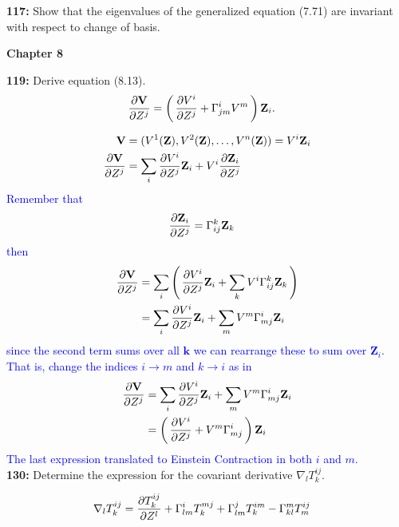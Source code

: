\documentclass[12pt,a4paper]{report}
\newcommand{\BLUE}[1]{\textcolor{blue}{#1}}
\newcommand{\COFF}[3]{\Gamma^{#1}_{{#2}{#3}}}
\newcommand{\VK}[1]{\textbf{#1}}
\begin{document}
\textbf{117: }Show that the eigenvalues of the generalized equation (7.71) are invariant with respect to change of basis.

\HLINE
\textbf{Chapter  8}

\textbf{119: }Derive equation (8.13).
\begin{align*}
	\PART{\VK{V}}{Z^j} &= \PAREN{\PART{V^i}{Z^j}+\COFF{i}{j}{m}V^m}\VK{Z}_i.
\end{align*}

\BLUE{\begin{align*}
	\VK{V} &= (V^1(\VK{Z}), V^2(\VK{Z}), \dots, V^n(\VK{Z})) = V^i\VK{Z}_i  \\
	\PART{\VK{V}}{Z^j} &= \sum_i \PART{V^i}{Z^j}\VK{Z}_i + V^i \PART{\VK{Z}_i}{Z^j} 
\end{align*}Remember that 
\begin{align*}
	\PART{\VK{Z}_i}{Z^j} &= \COFF{k}{i}{j}\VK{Z}_k
\end{align*}then
\begin{align*}
	\PART{\VK{V}}{Z^j} &= \sum_i \PAREN{ \PART{V^i}{Z^j}\VK{Z}_i + \sum_k V^i \COFF{k}{i}{j}\VK{Z}_k } \\
	&= \sum_i\PART{V^i}{Z^j}\VK{Z}_i + \sum_m V^m \COFF{i}{m}{j}\VK{Z}_i 
\end{align*}since the second term sums over all $\VK{k}$ we can rearrange these to sum over $\VK{Z}_i$.  That is, change the indices $i\to m$ and $k \to i$ as in 
\begin{align*}
	\PART{\VK{V}}{Z^j} &= \sum_i\PART{V^i}{Z^j}\VK{Z}_i + \sum_m V^m \COFF{i}{m}{j}\VK{Z}_i \\
	&= \PAREN{\PART{V^i}{Z^j} + V^m \COFF{i}{m}{j}}\VK{Z}_i 
\end{align*}The last expression translated to Einstein Contraction in both $i$ and $m$.
}\\

\textbf{130: }Determine the expression for the covariant derivative $\nabla_lT^{ij}_k$.

\BLUE{\begin{align*}
	\nabla_l T^{ij}_k &= \PART{T^{ij}_k}{Z^l}+ \COFF{i}{l}{m}T^{mj}_k + \COFF{j}{l}{m}T^{im}_k - \COFF{m}{k}{l}T^{ij}_m
\end{align*}
}
\end{document}
